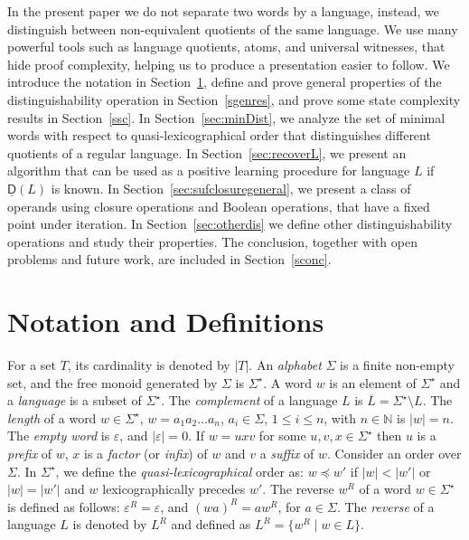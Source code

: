 \documentclass{article}
\newcommand{\N}{{\mathbb N}}
\newcommand{\comp}[1]{\overline{#1}}
\newcommand{\distmin}[1]{\underline{\mathsf{D}}(#1)}
\begin{document}
In the present paper we do not separate two words by a language,
instead, we distinguish between non-equivalent quotients of the same
language. We use many powerful tools such as 
language quotients, atoms, and universal witnesses, 
that hide proof complexity,
helping us to produce a presentation easier to follow.
We introduce the notation in Section~\ref{snotation},  define and
prove general properties of the distinguishability operation in
Section~\ref{sgenres}, and prove some state complexity results in
Section~\ref{ssc}.  
In Section~\ref{sec:minDist}, we analyze the set of minimal words with
respect to quasi-lexicographical order that distinguishes different
quotients of a regular language. 
In Section~\ref{sec:recoverL}, we present an algorithm that can be used
as a positive learning procedure for language $L$ if $\distmin{L}$ is known.
In Section~\ref{sec:sufclosuregeneral}, we present a class of operands using closure operations and Boolean operations, that have a 
fixed point under iteration. 
In Section~\ref{sec:otherdis} we define other distinguishability operations and study their properties.  
The conclusion, together with open problems and future work, are included 
in Section~\ref{sconc}. 


\section{Notation and Definitions}
\label{snotation}
For a set $T$, its cardinality is denoted by $|T|$. 
An \emph{alphabet} $\Sigma$ is a finite non-empty set, and the free monoid
generated by $\Sigma$ is $\Sigma^\star$. 
A word $w$ is an element of $\Sigma^\star$ and a \emph{language} is a subset of $\Sigma^\star$.  
The \emph{complement} of a language $L$ is $\comp{L}=\Sigma^\star\setminus L$.
The \emph{length} of a word $w\in \Sigma^\star$, $w=a_1a_2\ldots a_n$,
$a_i\in \Sigma$, $1\leq i\leq n$, with $n\in\N$ is $|w|=n$.  
The \emph{empty word} is $\varepsilon$, and $|\varepsilon|=0$. If $w=uxv$ for some $u,v,x\in \Sigma^\star$ then $u$ is a \emph{prefix} of $w$, $x$ is a \emph{factor} (or \emph{infix}) of $w$ and $v$ a \emph{suffix} of $w$.
Consider an order over $\Sigma$. 
In $\Sigma^\star$, we define the \emph{quasi-lexicographical} order as: $w\preceq w'$
if $|w|<|w'|$ or $|w|=|w'|$ and $w$ lexicographically precedes $w'$. 
The reverse $w^R$ of a
word $w\in \Sigma^\star$ is defined as follows: $\varepsilon^R=\varepsilon$, and $(wa)^R=aw^R$, for $a\in \Sigma$. 
The \emph{reverse} of a language $L$ is denoted by $L^R$ and defined as $L^R =\{w^R\mid w\in L\}$.
\end{document}

